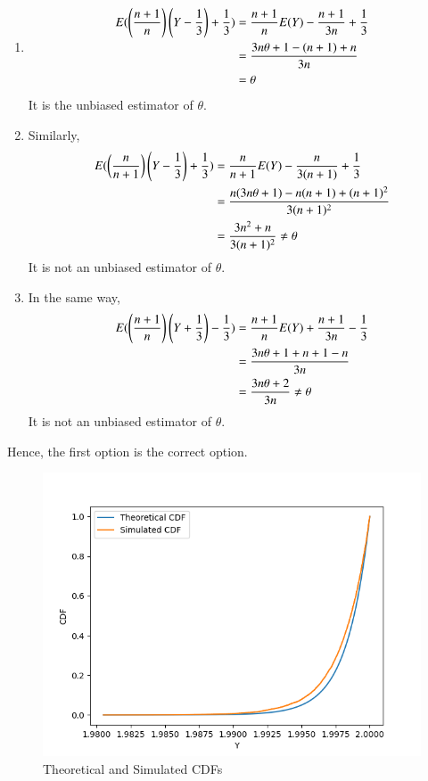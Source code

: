 \documentclass{article}[]
\begin{document}
\begin{enumerate}
\item
{
\begin{align}
E(\left(\frac{n+1}{n}\right)\left(Y-\frac{1}{3}\right) + \frac{1}{3}) &= \frac{n+1}{n}E(Y)-\frac{n+1}{3n} + \frac{1}{3}\\
&=\frac{3n\theta+1-(n+1)+n}{3n}\\
&=\theta
\end{align}
It is the unbiased estimator of $\theta$.
}
\item
{
Similarly,
\begin{align}
E(\left(\frac{n}{n+1}\right)\left(Y-\frac{1}{3}\right) + \frac{1}{3})&=\frac{n}{n+1}E(Y) - \frac{n}{3(n+1)} + \frac{1}{3}\\
&=\frac{n(3n\theta+1) - n(n+1) + (n+1)^2}{3(n+1)^2}\\
&=\frac{3n^2+n}{3(n+1)^2} \neq \theta
\end{align}
It is not an unbiased estimator of $\theta$.
}
\item
{
In the same way,
\begin{align}
E(\left(\frac{n+1}{n}\right)\left(Y+\frac{1}{3}\right) - \frac{1}{3})&=\frac{n+1}{n}E(Y) + \frac{n+1}{3n} - \frac{1}{3}\\
&=\frac{3n\theta+1+n+1-n}{3n}\\
&=\frac{3n\theta+2}{3n} \neq \theta
\end{align}
It is not an unbiased estimator of $\theta$.
}
\end{enumerate}
Hence, the first option is the correct option.

\begin{figure}[H]
\centering
\includegraphics{2023/ST/24/figs/estimations.png}
\caption{Theoretical and Simulated CDFs}
\label{ST:24.2023}
\end{figure}
\end{document}
